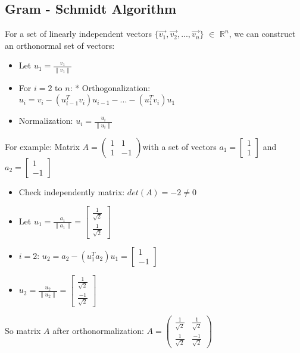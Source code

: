 \documentclass[a4paper, 12pt]{report}
\begin{document}
\subsection{Gram - Schmidt Algorithm }
\indent \par For a set of linearly independent vectors $\{\vec{v_1}, \vec{v_2},...,\vec{v_n}\}$ $\in$ $\mathbb{R}^n$, we can construct an orthonormal set of vectors:
 \begin{itemize}
  \item Let $u_1 = \frac{v_1}{\lVert v_1 \rVert}$

  \item For $i = 2$ to $n$:
    * Orthogonalization: $u_i = v_i - (u_{i-1}^Tv_i)u_{i-1} - ... - (u_1^Tv_i)u_1$
    
    \item Normalization: $u_i = \frac{u_i}{\lVert u_i \rVert}$
\end{itemize}
\indent \par For example: Matrix $A =\begin{pmatrix}
  1 & 1\\
  1 & -1
  \end{pmatrix}
  $with a set of vectors $a_1 = \begin{bmatrix}1\\1\end{bmatrix}$ and $a_2 = \begin{bmatrix}1\\-1\end{bmatrix}$
\begin{itemize}
  
  
  \item Check independently matrix: $det(A) = -2 \neq 0$
  
  \item Let $u_1 = \frac{a_1}{\lVert a_1 \rVert} = \begin{bmatrix} \frac{1}{\sqrt{2}} \\ \frac{1}{\sqrt{2}} \end{bmatrix}$
 
  \item $i = 2$:
  $u_2 = a_2 - (u_1^Ta_2)u_1 = \begin{bmatrix} 1 \\ -1 \end{bmatrix}$
 
  \item $u_2 = \frac{u_2}{\lVert u_2 \rVert} = \begin{bmatrix} \frac{1}{\sqrt{2}} \\ \frac{-1}{\sqrt{2}} \end{bmatrix}$
\end{itemize}  
\indent \par So matrix $A$ after orthonormalization:
  $A = \begin{pmatrix}
  \frac{1}{\sqrt{2}} & \frac{1}{\sqrt{2}}\\
  \frac{1}{\sqrt{2}} & \frac{-1}{\sqrt{2}}
  \end{pmatrix}$
\end{document}
